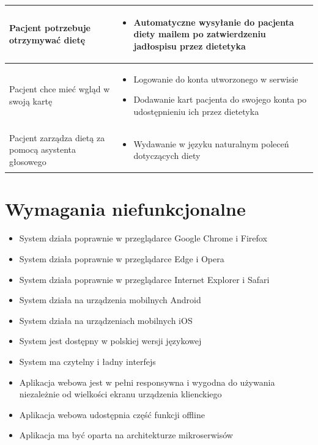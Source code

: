 \begin{minipage}{\textwidth}
\begin{table}[H]
\begin{tabular}{|p{}|p{}|}
            \hline
            Pacjent potrzebuje otrzymywać dietę &
            \begin{itemize}
                \item Automatyczne wysyłanie do pacjenta diety mailem po zatwierdzeniu jadłospisu przez dietetyka
            \end{itemize} \\
            \hline
            Pacjent chce mieć wgląd w swoją kartę &
            \begin{itemize}
                \item Logowanie do konta utworzonego w serwisie
                \item Dodawanie kart pacjenta do swojego konta po udostępnieniu ich przez dietetyka
            \end{itemize} \\
            \hline
            Pacjent zarządza dietą za pomocą asystenta głosowego &
            \begin{itemize}
                \item Wydawanie w języku naturalnym poleceń dotyczących diety
            \end{itemize} \\
            \hline
        \end{tabular}
    \end{table}
\end{minipage}

\newpage
\section{Wymagania niefunkcjonalne}
\begin{itemize}
    \item System działa poprawnie w przeglądarce Google Chrome i Firefox
    \item System działa poprawnie w przeglądarce Edge i Opera
    \item System działa poprawnie w przeglądarce Internet Explorer i Safari
    \item System działa na urządzenia mobilnych Android
    \item System działa na urządzeniach mobilnych iOS
    \item System jest dostępny w polskiej wersji językowej
    \item System ma czytelny i ładny interfejs
    \item Aplikacja webowa jest w pełni responsywna i wygodna do używania niezależnie od wielkości ekranu urządzenia klienckiego
    \item Aplikacja webowa udostępnia część funkcji offline
    \item Aplikacja ma być oparta na architekturze mikroserwisów
\end{itemize}

